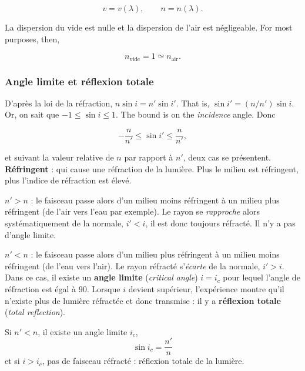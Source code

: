 \[ v = v(\lambda), \qquad n = n(\lambda). \]

La dispersion du vide est nulle et la dispersion de l'air est négligeable. For
most purposes, then,

\[ n_{\text{vide}} = 1 \simeq n_{\text{air}}. \]

\subsubsection{Angle limite et réflexion totale}

D'après la loi de la réfraction, $n \sin i = n' \sin i'$. That is,
$\sin i' = (n/n') \sin i$. Or, on sait que $-1 \le \sin i \le 1$. The bound is on
the \emph{incidence} angle. Donc

\[ -\frac{n}{n'} \le \sin i' \le \frac{n}{n'} , \]

et suivant la valeur relative de $n$ par rapport à $n'$, deux cas se présentent.
\textbf{Réfringent} : qui cause une réfraction de la lumière. Plus le milieu est
réfringent, plus l'indice de réfraction est élevé.

\begin{subpart}
  \item $n' > n$ : le faisceau passe alors d'un milieu moins réfringent à un
    milieu plus réfringent (de l'air vers l'eau par exemple). Le rayon se
    \emph{rapproche} alors systématiquement de la normale, $i' < i$, il est donc
    toujours réfracté. Il n'y a pas d'angle limite.
  \item $n' < n$ : le faisceau passe alors d'un milieu plus réfringent à un
    milieu moins réfringent (de l'eau vers l'air). Le rayon réfracté
    s'\emph{écarte} de la normale, $i' > i$. Dans ce cas, il existe un
    \textbf{angle limite} (\textit{critical angle}) $i = i_c$ pour lequel
    l'angle de réfraction est égal à $90$\textdegree. Lorsque $i$ devient supérieur, l'expérience montre qu'il
    n'existe plus de lumière réfractée et donc transmise : il y a
    \textbf{réflexion totale} (\textit{total reflection}).
\end{subpart}

\begin{theorem}
  Si $n' < n$, il existe un angle limite $i_c$,
  \[ \boxed{\ \sin i_c = \frac{n'}{n}\ } \]
  et si $i > i_c$, pas de faisceau réfracté : réflexion totale de la lumière.
\end{theorem}

